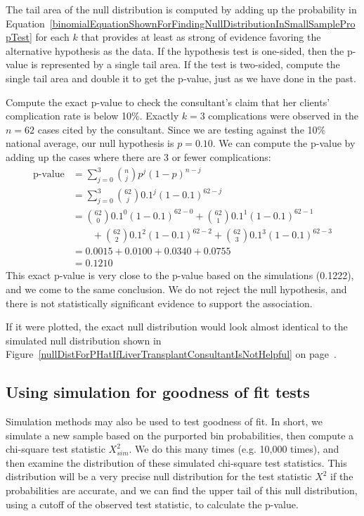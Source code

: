 The tail area of the null distribution is computed by adding up the probability in Equation~\eqref{binomialEquationShownForFindingNullDistributionInSmallSamplePropTest} for each $k$ that provides at least as strong of evidence favoring the alternative hypothesis as the data. If the hypothesis test is one-sided, then the p-value is represented by a single tail area. If the test is two-sided, compute the single tail area and double it to get the p-value, just as we have done in the past.

\begin{example}{Compute the exact p-value to check the consultant's claim that her clients' complication rate is below 10\%.}
Exactly $k=3$ complications were observed in the $n=62$ cases cited by the consultant. Since we are testing against the 10\% national average, our null hypothesis is $p=0.10$. We can compute the p-value by adding up the cases where there are 3 or fewer complications:
\begin{align*}
\text{p-value}
	&= \sum_{j=0}^{3} {n\choose j} p^{j}(1-p)^{n-j} \\
	&= \sum_{j=0}^{3} {62\choose j} 0.1^{j}(1-0.1)^{62-j} \\
	&= {62\choose 0} 0.1^{0}(1-0.1)^{62-0} +
		{62\choose 1} 0.1^{1}(1-0.1)^{62-1} \\
	& \qquad + {62\choose 2} 0.1^{2}(1-0.1)^{62-2} +
		{62\choose 3} 0.1^{3}(1-0.1)^{62-3} \\
	&= 0.0015 + 0.0100 + 0.0340 + 0.0755 \\
	&= 0.1210
\end{align*}
This exact p-value is very close to the p-value based on the simulations (0.1222), and we come to the same conclusion. We do not reject the null hypothesis, and there is not statistically significant evidence to support the association.

If it were plotted, the exact null distribution would look almost identical to the simulated null distribution shown in Figure~\ref{nullDistForPHatIfLiverTransplantConsultantIsNotHelpful} on page~\pageref{nullDistForPHatIfLiverTransplantConsultantIsNotHelpful}.
\end{example}


\subsection{Using simulation for goodness of fit tests}

Simulation methods may also be used to test goodness of fit. In short, we simulate a new sample based on the purported bin probabilities, then compute a chi-square test statistic $X_{sim}^2$. We do this many times (e.g. 10,000 times), and then examine the distribution of these simulated chi-square test statistics. This distribution will be a very precise null distribution for the test statistic $X^2$ if the probabilities are accurate, and we can find the upper tail of this null distribution, using a cutoff of the observed test statistic, to calculate the p-value.

